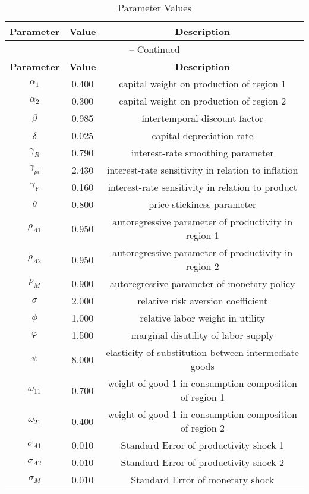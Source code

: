 \begin{center}
\begin{longtable}{ccc}
\caption{Parameter Values}\\%
\toprule%
\multicolumn{1}{c}{\textbf{Parameter}} &
\multicolumn{1}{c}{\textbf{Value}} &
 \multicolumn{1}{c}{\textbf{Description}}\\%
\midrule%
\endfirsthead
\multicolumn{3}{c}{{\tablename} \thetable{} -- Continued}\\%
\midrule%
\multicolumn{1}{c}{\textbf{Parameter}} &
\multicolumn{1}{c}{\textbf{Value}} &
  \multicolumn{1}{c}{\textbf{Description}}\\%
\midrule%
\endhead
${\alpha_{1}}$ 	 & 	 0.400 	 & 	 capital weight on production of region 1\\
${\alpha_{2}}$ 	 & 	 0.300 	 & 	 capital weight on production of region 2\\
${\beta}$ 	 & 	 0.985 	 & 	 intertemporal discount factor\\
${\delta}$ 	 & 	 0.025 	 & 	 capital depreciation rate\\
${\gamma_{R}}$ 	 & 	 0.790 	 & 	 interest-rate smoothing parameter\\
${\gamma_{pi}}$ 	 & 	 2.430 	 & 	 interest-rate sensitivity in relation to inflation\\
${\gamma_{Y}}$ 	 & 	 0.160 	 & 	 interest-rate sensitivity in relation to product\\
${\theta}$ 	 & 	 0.800 	 & 	 price stickiness parameter\\
${\rho_{A1}}$ 	 & 	 0.950 	 & 	 autoregressive parameter of productivity in region 1\\
${\rho_{A2}}$ 	 & 	 0.950 	 & 	 autoregressive parameter of productivity in region 2\\
${\rho_{M}}$ 	 & 	 0.900 	 & 	 autoregressive parameter of monetary policy\\
${\sigma}$ 	 & 	 2.000 	 & 	 relative risk aversion coefficient\\
${\phi}$ 	 & 	 1.000 	 & 	 relative labor weight in utility\\
${\varphi}$ 	 & 	 1.500 	 & 	 marginal disutility of labor supply\\
${\psi}$ 	 & 	 8.000 	 & 	 elasticity of substitution between intermediate goods\\
${\omega_{11}}$ 	 & 	 0.700 	 & 	 weight of good 1 in consumption composition of region 1\\
${\omega_{21}}$ 	 & 	 0.400 	 & 	 weight of good 1 in consumption composition of region 2\\
${\sigma_{A1}}$ 	 & 	 0.010 	 & 	 Standard Error of productivity shock 1\\
${\sigma_{A2}}$ 	 & 	 0.010 	 & 	 Standard Error of productivity shock 2\\
${\sigma_M}$ 	 & 	 0.010 	 & 	 Standard Error of monetary shock\\
\bottomrule%
\end{longtable}
\end{center}
